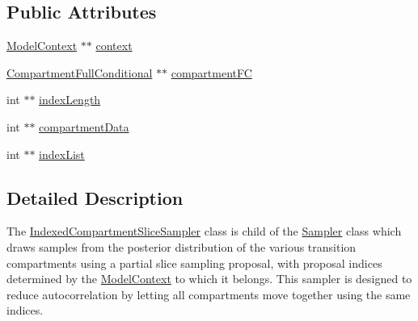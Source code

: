 \subsection*{Public Attributes}
\begin{DoxyCompactItemize}
\item 
\hyperlink{classSpatialSEIR_1_1ModelContext}{Model\-Context} $\ast$$\ast$ \hyperlink{classSpatialSEIR_1_1IndexedCompartmentSliceSampler_a387edb6d90edf9b39452985db5accfd4}{context}
\item 
\hyperlink{classSpatialSEIR_1_1CompartmentFullConditional}{Compartment\-Full\-Conditional} $\ast$$\ast$ \hyperlink{classSpatialSEIR_1_1IndexedCompartmentSliceSampler_a7fc85c9a378b1d9fc0e23f98500c92ba}{compartment\-F\-C}
\item 
int $\ast$$\ast$ \hyperlink{classSpatialSEIR_1_1IndexedCompartmentSliceSampler_ada391aecf581b46873e89a3c6c600859}{index\-Length}
\item 
int $\ast$$\ast$ \hyperlink{classSpatialSEIR_1_1IndexedCompartmentSliceSampler_ad5b34688ef3b6a8ee52fdcde13308be5}{compartment\-Data}
\item 
int $\ast$$\ast$ \hyperlink{classSpatialSEIR_1_1IndexedCompartmentSliceSampler_ad52c949b38fc58f6f734aeb589655c20}{index\-List}
\end{DoxyCompactItemize}


\subsection{Detailed Description}
The \hyperlink{classSpatialSEIR_1_1IndexedCompartmentSliceSampler}{Indexed\-Compartment\-Slice\-Sampler} class is child of the \hyperlink{classSpatialSEIR_1_1Sampler}{Sampler} class which draws samples from the posterior distribution of the various transition compartments using a partial slice sampling proposal, with proposal indices determined by the \hyperlink{classSpatialSEIR_1_1ModelContext}{Model\-Context} to which it belongs. This sampler is designed to reduce autocorrelation by letting all compartments move together using the same indices. 

